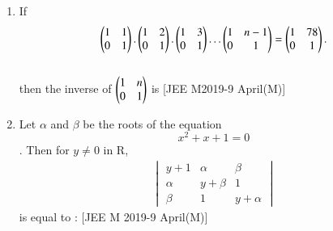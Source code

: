 \documentclass[journal,,12pt,twocolumn]{IEEEtran}
\theoremstyle{remark}
\begin{document}
\begin{enumerate}
\begin{enumerate}
\end{enumerate} 
\item If \begin{align}\begin{pmatrix}
    1 & 1 \\
    0 & 1
\end{pmatrix}.\begin{pmatrix}
    1 & 2 \\
    0 & 1
\end{pmatrix}.\begin{pmatrix}
    1 & 3 \\
    0 & 1
\end{pmatrix}\dots \begin{pmatrix}
    1 & n-1 \\
    0 & 1
\end{pmatrix}=\begin{pmatrix}
    1 & 78 \\
    0 & 1
\end{pmatrix}.\end{align}\\
then the inverse of $\begin{pmatrix}
    1 & n \\
    0 & 1
\end{pmatrix}$ is 
\hfill{[JEE M2019-9 April(M)]} 
\begin{enumerate}
\end{enumerate}
\item Let $\alpha$ and $\beta$ be the roots of the equation $$x^2+x+1=0$$. Then for $y\ne0$ in R,\\
\begin{align}\begin{vmatrix}
   y+1 & \alpha & \beta \\
    \alpha & y+\beta & 1 \\
    \beta & 1 & y+\alpha
\end{vmatrix} \end{align} is equal to : 
\hfill{[JEE M 2019-9 April(M)]} 
\begin{enumerate}
\end{enumerate}

\end{enumerate}
    
\end{document}
